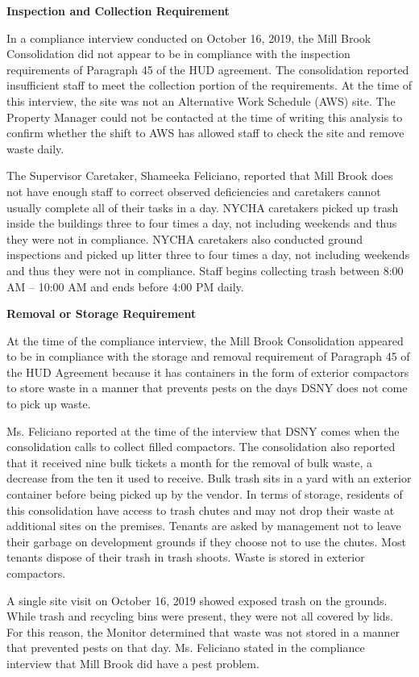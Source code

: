 
\textbf{Inspection and Collection Requirement} 

In a compliance interview conducted on October 16, 2019, the Mill Brook Consolidation did not appear to be in compliance with the inspection requirements of Paragraph 45 of the HUD agreement. The consolidation reported insufficient staff to meet the collection portion of the requirements. At the time of this interview, the site was not an Alternative Work Schedule (AWS) site. The Property Manager could not be contacted at the time of writing this analysis to confirm whether the shift to AWS has allowed staff to check the site and remove waste daily.

The Supervisor Caretaker, Shameeka Feliciano, reported that Mill Brook does not have enough staff to correct observed deficiencies and caretakers cannot usually complete all of their tasks in a day. NYCHA caretakers picked up trash inside the buildings three to four times a day, not including weekends and thus they were not in compliance. NYCHA caretakers also conducted ground inspections and picked up litter three to four times a day, not including weekends and thus they were not in compliance. Staff begins collecting trash between 8:00 AM -- 10:00 AM and ends before 4:00 PM daily.

\textbf{Removal or Storage Requirement}

At the time of the compliance interview, the Mill Brook Consolidation appeared to be in compliance with the storage and removal requirement of Paragraph 45 of the HUD Agreement because it has containers in the form of exterior compactors to store waste in a manner that prevents pests on the days DSNY does not come to pick up waste.

Ms. Feliciano reported at the time of the interview that DSNY comes when the consolidation calls to collect filled compactors. The consolidation also reported that it received nine bulk tickets a month for the removal of bulk waste, a decrease from the ten it used to receive. Bulk trash sits in a yard with an exterior container before being picked up by the vendor. In terms of storage, residents of this consolidation have access to trash chutes and may not drop their waste at additional sites on the premises. Tenants are asked by management not to leave their garbage on development grounds if they choose not to use the chutes. Most tenants dispose of their trash in trash shoots. Waste is stored in exterior compactors.

A single site visit on October 16, 2019 showed exposed trash on the grounds. While trash and recycling bins were present, they were not all covered by lids. For this reason, the Monitor determined that waste was not stored in a manner that prevented pests on that day. Ms. Feliciano stated in the compliance interview that Mill Brook did have a pest problem.

